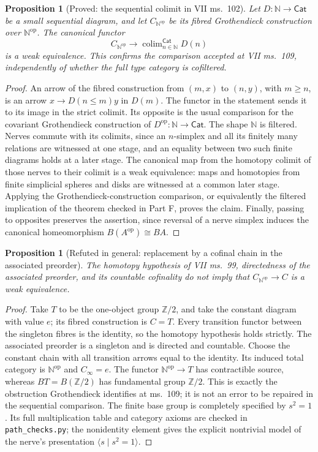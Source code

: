 \documentclass[11pt,a4paper]{article}
\newtheorem{proposition}[theorem]{Proposition}
\theoremstyle{definition}
\theoremstyle{remark}
\begin{document}
\begin{proposition}[Proved: the sequential colimit in VII ms.~102]
\label{F4:sequential}
Let $D:\mathbb N\to\mathsf{Cat}$ be a small sequential diagram,
and let $C_{\mathbb N^{\mathrm{op}}}$ be its fibred Grothendieck
construction over $\mathbb N^{\mathrm{op}}$.  The canonical functor
\[
C_{\mathbb N^{\mathrm{op}}}\longrightarrow
\operatorname{colim}^{\mathsf{Cat}}_{n\in\mathbb N}D(n)
\]
is a weak equivalence.  This confirms the comparison accepted at
VII ms.~109, independently of whether the full type category is
cofiltered.
\end{proposition}
\begin{proof}
An arrow of the fibred construction from $(m,x)$ to $(n,y)$, with
$m\geq n$, is an arrow $x\to D(n\leq m)y$ in $D(m)$.  The functor
in the statement sends it to its image in the strict colimit.  Its
opposite is the usual comparison for the covariant Grothendieck
construction of $D^{\mathrm{op}}:\mathbb N\to\mathsf{Cat}$.
The shape $\mathbb N$ is filtered.  Nerves commute with its colimits,
since an $n$-simplex and all its finitely many relations are witnessed
at one stage, and an equality between two such finite diagrams holds
at a later stage.  The canonical map from the homotopy colimit of
those nerves to their colimit is a weak equivalence: maps and
homotopies from finite simplicial spheres and disks are witnessed at
a common later stage.  Applying the Grothendieck-construction
comparison, or equivalently the filtered implication of the theorem
checked in Part F, proves the claim.  Finally, passing to opposites
preserves the assertion, since reversal of a nerve simplex induces
the canonical homeomorphism $B(A^{\mathrm{op}})\cong BA$.
\end{proof}

\begin{proposition}[Refuted in general: replacement by a cofinal chain
in the associated preorder]\label{F4:preorder-chain}
The homotopy hypothesis of VII ms.~99, directedness of the associated
preorder, and its countable cofinality do not imply that
$C_{\mathbb N^{\mathrm{op}}}\to C$ is a weak equivalence.
\end{proposition}
\begin{proof}
Take $T$ to be the one-object group $\mathbb Z/2$, and take the constant
diagram with value $e$; its fibred construction is $C=T$.
Every transition functor between the singleton fibres is the identity,
so the homotopy hypothesis holds strictly.  The associated preorder
is a singleton and is directed and countable.  Choose the constant
chain with all transition arrows equal to the identity.  Its induced
total category is $\mathbb N^{\mathrm{op}}$ and $C_\infty=e$.
The functor $\mathbb N^{\mathrm{op}}\to T$ has contractible source,
whereas $BT=B(\mathbb Z/2)$ has fundamental group $\mathbb Z/2$.
This is exactly the obstruction Grothendieck identifies at ms.~109;
it is not an error to be repaired in the sequential comparison.
The finite base group is completely specified by $s^2=1$.
Its full multiplication table and category axioms are checked in
\texttt{path\_checks.py}; the nonidentity element gives the explicit
nontrivial model of the nerve's presentation $\langle s\mid s^2=1\rangle$.
\end{proof}
\end{document}

